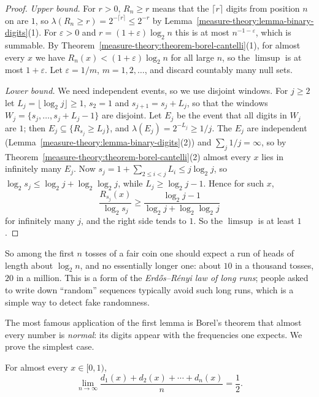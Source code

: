 \begin{proof}
\emph{Upper bound.} For $r > 0$, $R_n \geq r$ means that the $\lceil r\rceil$ digits from position $n$ on are $1$, so $\lambda(R_n \geq r) = 2^{-\lceil r\rceil} \leq 2^{-r}$ by
Lemma~\ref{measure-theory:lemma-binary-digits}(1). For $\varepsilon > 0$ and $r = (1 + \varepsilon)\log_2n$ this is at most $n^{-1-\varepsilon}$, which is summable. By
Theorem~\ref{measure-theory:theorem-borel-cantelli}(1), for almost every $x$ we have $R_n(x) < (1 + \varepsilon)\log_2n$ for all large $n$, so the $\limsup$ is at most $1 + \varepsilon$. Let
$\varepsilon = 1/m$, $m = 1, 2, \ldots$, and discard countably many null sets.

\emph{Lower bound.} We need independent events, so we use disjoint windows. For $j \geq 2$ let $L_j = \lfloor\log_2j\rfloor \geq 1$, $s_2 = 1$ and $s_{j+1} = s_j + L_j$, so that the windows
$W_j = \{s_j, \ldots, s_j + L_j - 1\}$ are disjoint. Let $E_j$ be the event that all digits in $W_j$ are $1$; then $E_j \subseteq \{R_{s_j} \geq L_j\}$, and $\lambda(E_j) = 2^{-L_j} \geq 1/j$. The $E_j$ are
independent (Lemma~\ref{measure-theory:lemma-binary-digits}(2)) and $\sum_j1/j = \infty$, so by Theorem~\ref{measure-theory:theorem-borel-cantelli}(2) almost every $x$ lies in infinitely many $E_j$. Now
$s_j = 1 + \sum_{2 \leq i < j}L_i \leq j\log_2j$, so $\log_2s_j \leq \log_2j + \log_2\log_2j$, while $L_j \geq \log_2j - 1$. Hence for such $x$,
\[
\frac{R_{s_j}(x)}{\log_2s_j} \geq \frac{\log_2j - 1}{\log_2j + \log_2\log_2j}
\]
for infinitely many $j$, and the right side tends to $1$. So the $\limsup$ is at least $1$.
\end{proof}

So among the first $n$ tosses of a fair coin one should expect a run of heads of length about $\log_2n$, and no essentially longer one: about $10$ in a thousand tosses, $20$ in a million. This is a form
of the \emph{Erd\H{o}s--R\'enyi law of long runs}; people asked to write down ``random'' sequences typically avoid such long runs, which is a simple way to detect fake randomness.

The most famous application of the first lemma is Borel's theorem that almost every number is \emph{normal}: its digits appear with the frequencies one expects. We prove the simplest case.

\begin{theorem}\label{measure-theory:theorem-borel-normal}
For almost every $x \in [0, 1)$,
\[
\lim_{n \to \infty}\frac{d_1(x) + d_2(x) + \cdots + d_n(x)}{n} = \frac12 .
\]
\end{theorem}

